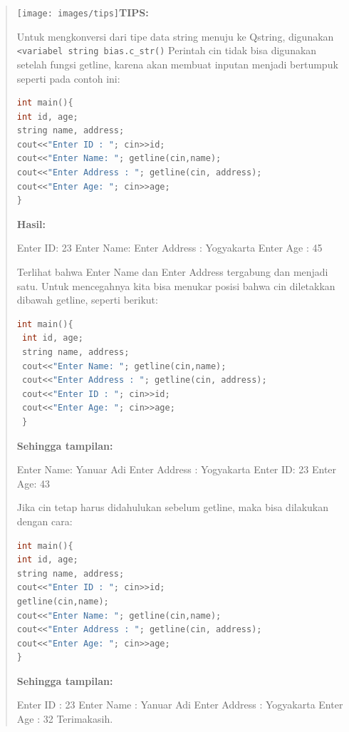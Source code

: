 \begin{quotation}

\texttt{[image: images/tips]}\textbf{TIPS:} 

Untuk
mengkonversi dari tipe data string menuju ke Qstring, digunakan
\texttt{\textless{}variabel\ string\ bias.c\_str()} Perintah cin tidak
bisa digunakan setelah fungsi getline, karena akan membuat inputan
menjadi bertumpuk seperti pada contoh ini:

\begin{lstlisting}[language=c++, numbers=none]
int main(){
int id, age;
string name, address;
cout<<"Enter ID : "; cin>>id;
cout<<"Enter Name: "; getline(cin,name);
cout<<"Enter Address : "; getline(cin, address);
cout<<"Enter Age: "; cin>>age;
}
\end{lstlisting}

\textbf{Hasil:}

\begin{lcverbatim}
Enter ID: 23
Enter Name: Enter Address : Yogyakarta
Enter Age : 45
\end{lcverbatim}

Terlihat bahwa Enter Name dan Enter Address tergabung dan menjadi satu.
Untuk mencegahnya kita bisa menukar posisi bahwa cin diletakkan dibawah
getline, seperti berikut:

\begin{lstlisting}[language=c++, numbers=none]
int main(){
 int id, age;
 string name, address;
 cout<<"Enter Name: "; getline(cin,name);
 cout<<"Enter Address : "; getline(cin, address);
 cout<<"Enter ID : "; cin>>id;
 cout<<"Enter Age: "; cin>>age;
 }
\end{lstlisting}

\textbf{Sehingga tampilan:}

\begin{lcverbatim}
Enter Name: Yanuar Adi
Enter Address : Yogyakarta
Enter ID: 23
Enter Age: 43
\end{lcverbatim}

Jika cin tetap harus didahulukan sebelum getline, maka bisa dilakukan
dengan cara:

\begin{lstlisting}[language=c++, numbers=none]
int main(){
int id, age;
string name, address;
cout<<"Enter ID : "; cin>>id;
getline(cin,name);
cout<<"Enter Name: "; getline(cin,name);
cout<<"Enter Address : "; getline(cin, address);
cout<<"Enter Age: "; cin>>age;
}
\end{lstlisting}

\textbf{Sehingga tampilan:}

\begin{lcverbatim}
Enter ID : 23
Enter Name : Yanuar Adi
Enter Address : Yogyakarta
Enter Age : 32
Terimakasih.
\end{lcverbatim}
\end{quotation}

